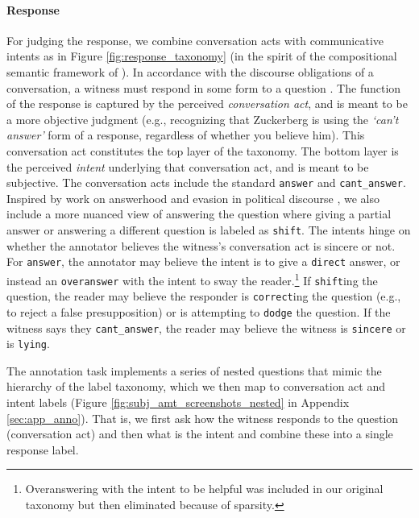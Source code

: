 \paragraph{Response} For judging the response, we combine conversation acts with communicative intents as in Figure \ref{fig:response_taxonomy} (in the spirit of the compositional semantic framework of ). In accordance with the discourse obligations of a conversation, a witness must respond in some form to a question \cite{Traum:1994}. The function of the response is captured by the perceived \emph{conversation act}, and is meant to be a more objective judgment (e.g., recognizing that Zuckerberg is using the \emph{`can't answer'} form of a response, regardless of whether you believe him). This conversation act constitutes the top layer of the taxonomy. The bottom layer is the perceived \emph{intent} underlying that conversation act, and is meant to be subjective. The conversation acts include the standard \texttt{answer} and \texttt{cant\_answer}. Inspired by work on answerhood \cite{Ginzburg:2019,DeMarneffe:2009,Groenendijk:1984} and evasion in political discourse \cite{Gabrielsen:2017}, we also include a more nuanced view of answering the question where giving a partial answer or answering a different question is labeled as \texttt{shift}. The intents hinge on whether the annotator believes the witness's conversation act is sincere or not. For \texttt{answer}, the annotator may believe the intent is to give a \texttt{direct} answer, or instead an \texttt{overanswer} with the intent to sway the reader.\footnote{Overanswering with the intent to be helpful was included in our original taxonomy but then eliminated because of sparsity.} If \texttt{shift}ing the question, the reader may believe the responder is \texttt{correct}ing the question (e.g., to reject a false presupposition) or is attempting to \texttt{dodge} the question. If the witness says they \texttt{cant\_answer}, the reader may believe the witness is \texttt{sincere} or is \texttt{lying}.

The annotation task implements a series of nested questions that mimic the hierarchy of the label taxonomy, which we then map to conversation act and intent labels (Figure \ref{fig:subj_amt_screenshots_nested} in Appendix \ref{sec:app_anno}).
That is, we first ask how the witness responds to the question (conversation act) and then what is the intent and combine these into a single response label.


